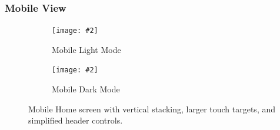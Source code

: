 \documentclass[fontsize=13pt,a4paper]{article}
\newcommand{\maxgraph}[2][]{%
  \texttt{[image: \#2]}%
}
\begin{document}
\subsubsection*{Mobile View}
\FloatBarrier
\begin{figure}[H]
  \centering
  \begin{subfigure}{0.48\linewidth}
    \maxgraph[width=\linewidth]{home_lightmode_mobile.jpg}
    \caption{Mobile Light Mode}
  \end{subfigure}\hfill
  \begin{subfigure}{0.48\linewidth}
    \maxgraph[width=\linewidth]{home_darkmode_mobile.jpg}
    \caption{Mobile Dark Mode}
  \end{subfigure}
  \caption{Mobile Home screen with vertical stacking, larger touch targets, and simplified header controls.}
  \label{fig:home_mobile}
\end{figure}
\FloatBarrier
\end{document}
